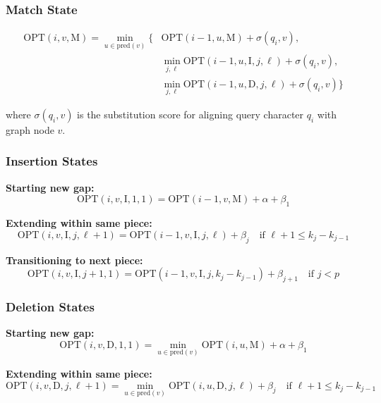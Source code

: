 \documentclass[11pt]{article}
\begin{document}
\subsubsection{Match State}
\begin{align}
\text{OPT}(i, v, \text{M}) = \min_{u \in \text{pred}(v)} \{ &\text{OPT}(i-1, u, \text{M}) + \sigma(q_i, v), \\
&\min_{j,\ell} \text{OPT}(i-1, u, \text{I}, j, \ell) + \sigma(q_i, v), \\
&\min_{j,\ell} \text{OPT}(i-1, u, \text{D}, j, \ell) + \sigma(q_i, v) \}
\end{align}

where $\sigma(q_i, v)$ is the substitution score for aligning query character $q_i$ with graph node $v$.

\subsubsection{Insertion States}

\textbf{Starting new gap:}
\begin{equation}
\text{OPT}(i, v, \text{I}, 1, 1) = \text{OPT}(i-1, v, \text{M}) + \alpha + \beta_1
\end{equation}

\textbf{Extending within same piece:}
\begin{equation}
\text{OPT}(i, v, \text{I}, j, \ell+1) = \text{OPT}(i-1, v, \text{I}, j, \ell) + \beta_j \quad \text{if } \ell+1 \leq k_j - k_{j-1}
\end{equation}

\textbf{Transitioning to next piece:}
\begin{equation}
\text{OPT}(i, v, \text{I}, j+1, 1) = \text{OPT}(i-1, v, \text{I}, j, k_j - k_{j-1}) + \beta_{j+1} \quad \text{if } j < p
\end{equation}

\subsubsection{Deletion States}

\textbf{Starting new gap:}
\begin{equation}
\text{OPT}(i, v, \text{D}, 1, 1) = \min_{u \in \text{pred}(v)} \text{OPT}(i, u, \text{M}) + \alpha + \beta_1
\end{equation}

\textbf{Extending within same piece:}
\begin{equation}
\text{OPT}(i, v, \text{D}, j, \ell+1) = \min_{u \in \text{pred}(v)} \text{OPT}(i, u, \text{D}, j, \ell) + \beta_j \quad \text{if } \ell+1 \leq k_j - k_{j-1}
\end{equation}
\end{document}
